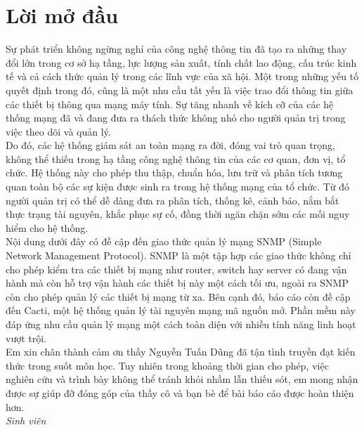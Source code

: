 \documentclass[12pt,oneside,a4paper]{article}
\begin{document}
	\setlength{\parindent}{0pt}

	\newpage
	\tableofcontents
	\newpage
	

\section*{Lời mở đầu}
%
Sự phát triển không ngừng nghỉ của công nghệ thông tin đã tạo ra những thay đổi lớn trong cơ sở hạ tầng, lực lượng sản xuất, tính chất lao động, cấu trúc kinh tế và cả cách thức quản lý trong các lĩnh vực của xã hội. Một trong những yếu tố quyết định trong đó, cũng là một nhu cầu tất yếu là việc trao đổi thông tin giữa các thiết bị thông qua mạng máy tính. Sự tăng nhanh về kích cỡ của các hệ thống mạng đã và đang đưa ra thách thức không nhỏ cho người quản trị trong việc theo dõi và quản lý.\\

Do đó, các hệ thống giám sát an toàn mạng ra đời, đóng vai trò quan trọng, không thể thiếu trong hạ tầng công nghệ thông tin của các cơ quan, đơn vị, tổ chức. Hệ thống này cho phép thu thập, chuẩn hóa, lưu trữ và phân tích tương quan toàn bộ các sự kiện được sinh ra trong hệ thống mạng của tổ chức. Từ đó người quản trị có thể dễ dàng đưa ra phân tích, thống kê, cảnh báo, nắm bắt thực trạng tài nguyên, khắc phục sự cố, đồng thời ngăn chặn sớm các mối nguy hiểm cho hệ thống.\\

Nội dung dưới đây có đề cập đến giao thức quản lý mạng SNMP (Simple Network Management Protocol). SNMP là một tập hợp các giao thức không chỉ cho phép kiểm tra các thiết bị mạng như router, switch hay server có đang vận hành mà còn hỗ trợ vận hành các thiết bị này một cách tối ưu, ngoài ra SNMP còn cho phép quản lý các thiết bị mạng từ xa. Bên cạnh đó, báo cáo còn đề cập đến Cacti, một hệ thống quản lý tài nguyên mạng mã nguồn mở. Phần mềm này đáp ứng nhu cầu quản lý mạng một cách toàn diện với nhiều tính năng linh hoạt vượt trội.\\

Em xin chân thành cảm ơn thầy Nguyễn Tuấn Dũng đã tận tình truyền đạt kiến thức trong suốt môn học. Tuy nhiên trong khoảng thời gian cho phép, việc nghiên cứu và trình bày không thể tránh khỏi nhầm lẫn thiếu sót, em mong nhận được sự giúp đỡ đóng góp của thầy cô và bạn bè để bài báo cáo được hoàn thiện hơn.\\
\vspace{1cm}
\textit{Sinh viên}\\
\end{document}
